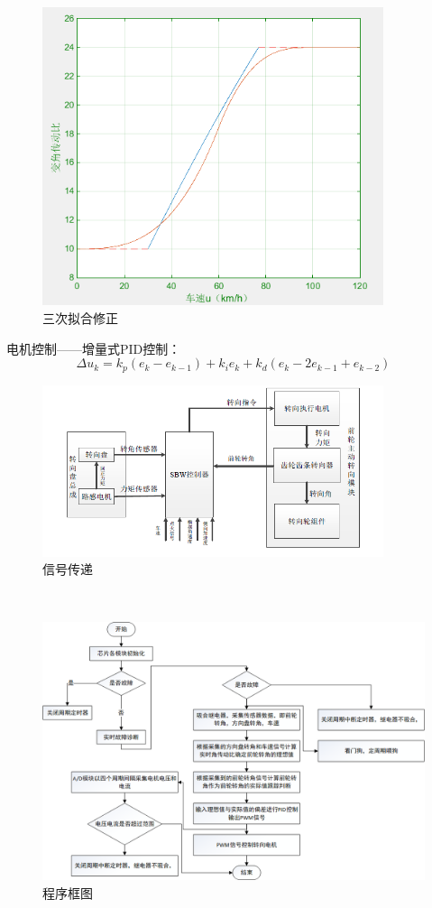 \documentclass[a4paper,12pt,UTF8]{ctexart}
\begin{document}
\begin{figure}[htbp]
  \centering
  \includegraphics[width=10cm]{8.png}
  \caption{三次拟合修正}
\end{figure}\newpage
\indent 电机控制——增量式PID控制：\\
\begin{equation}
  \Delta u_k=k_p(e_k-e_{k-1})+k_i e_k+k_d(e_k-2e_{k-1}+e_{k-2})
\end{equation}
\begin{figure}[htbp]
  \centering
  \includegraphics[width=10cm]{4.png}
  \caption{信号传递}
\end{figure}\\
\begin{figure}[htbp]
  \centering
  \includegraphics[width=16cm]{9.png}
  \caption{程序框图}
\end{figure}\\
\end{document}
